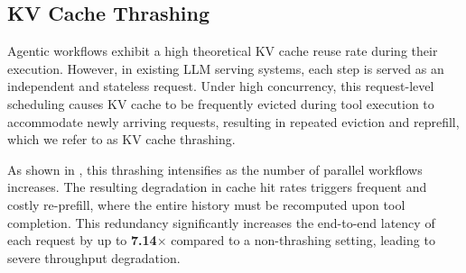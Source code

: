 \subsection{KV Cache Thrashing}
\label{sec:kv cache management}

Agentic workflows exhibit a high theoretical KV cache reuse rate during their execution. However, in existing LLM serving systems, each step is served as an independent and stateless request.  Under high concurrency, this request-level scheduling causes KV cache to be
frequently evicted during tool execution to accommodate newly arriving
requests, resulting in repeated eviction and reprefill, which we refer to
as KV cache thrashing.


As shown in , this thrashing intensifies as the number of parallel workflows increases. The resulting degradation in cache hit rates triggers frequent and costly re-prefill, where the entire history must be recomputed upon tool completion. This redundancy significantly increases the end-to-end latency of each request by up to \textbf{7.14$\times$} compared to a non-thrashing setting, leading to severe throughput degradation.

\vspace{-2mm}

